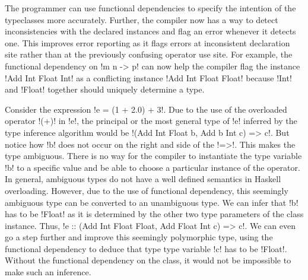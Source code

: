 \documentclass[format=sigplan,manuscript,review,screen,nonacm,margin=1in]{acmart}
\begin{document}
The programmer can use functional dependencies to specify the intention of the typeclasses
more accurately. Further, the compiler now has a way to detect inconsistencies with
the declared instances and flag an error whenever it detects one.
This improves error reporting as it flags errors at inconsistent declaration site
rather than at the previously confusing operator use site. For example,
the functional dependency on !m n -> p! can now help the compiler flag
the instance !Add Int Float Int! as a conflicting instance
!Add Int Float Float! because !Int! and !Float! together should uniquely determine a type.

Consider the expression !e = (1 + 2.0) + 3!. Due to the use of the overloaded operator !(+)! in !e!,
the principal or the most general type of !e! inferred by the type inference algorithm would be
!(Add Int Float b, Add b Int c) => c!. But notice how !b! does not occur on the right and
side of the !=>!. This makes the type ambiguous. There is no way for the compiler
to instantiate the type variable !b! to a specific value and
be able to choose a particular instance of the operator. In general, ambiguous types do not have
a well defined semantics in Haskell overloading. However, due to the use of functional dependency,
this seemingly ambiguous type can be converted to an unambiguous type.
We can infer that !b! has to be !Float! as it is determined by the other two type parameters of the class instance.
Thus, !e :: (Add Int Float Float, Add Float Int c) => c!.
We can even go a step further and improve this seemingly polymorphic type, using the functional dependency
to deduce that type type variable !c! has to be !Float!.
Without the functional dependency on the class, it would not be impossible
to make such an inference.
\end{document}
